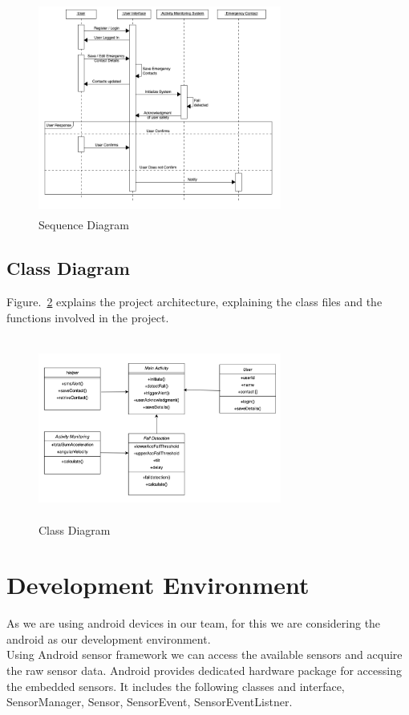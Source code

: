 \documentclass[conference]{IEEEtran}
\begin{document}
\begin{figure}
\centerline{\includegraphics[width=8cm, height=7cm]{sequenceDiagram.png}}
\caption{Sequence Diagram}
\label{sequenceDiagram}
\end{figure} 

\subsection{Class Diagram}
Figure.~\ref{classDiagram} explains the project architecture, explaining the class files and the functions involved in the project.

\begin{figure}
\centerline{\includegraphics[width=8cm, height=6cm]{classDiagram.png}}
\caption{Class Diagram}
\label{classDiagram}
\end{figure}

\section{Development Environment}
As we are using android devices in our team, for this we are considering the android as our development environment.\\
Using Android sensor framework we can access the available sensors and acquire the raw sensor data. Android provides dedicated hardware package for accessing the embedded sensors. It includes the following classes and interface, SensorManager, Sensor, SensorEvent, SensorEventListner.
\end{document}
